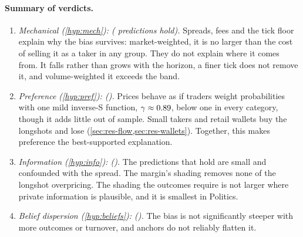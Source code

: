 \paragraph{Summary of verdicts.}
\begin{enumerate}
  \item \emph{Mechanical (\cref{hyp:mech}): \sdVerdictOne{} (\sdPassedOne{} predictions hold).} Spreads, fees and
  the tick floor explain why the bias survives: market-weighted, it is no larger than the cost of selling it as a
  taker in any group. They do not explain where it comes from. It falls rather than grows with the horizon, a
  finer tick does not remove it, and volume-weighted it exceeds the band.
  \item \emph{Preference (\cref{hyp:pref}): \sdVerdictTwo{} (\sdPassedTwo).} Prices behave as if traders weight
  probabilities with one mild inverse-S function, $\gamma\approx0.89$, below one in every category, though it
  adds little out of sample. Small takers and retail wallets buy the longshots and lose
  (\cref{sec:res-flow,sec:res-wallets}). Together, this makes preference the best-supported explanation.
  \item \emph{Information (\cref{hyp:info}): \sdVerdictThree{} (\sdPassedThree).} The predictions that hold are
  small and confounded with the spread. The margin's shading removes none of the longshot overpricing. The shading
  the outcomes require is not larger where private information is plausible, and it is smallest in Politics.
  \item \emph{Belief dispersion (\cref{hyp:beliefs}): \sdVerdictFour{} (\sdPassedFour).} The bias is not
  significantly steeper with more outcomes or turnover, and anchors do not reliably flatten it.
\end{enumerate}

